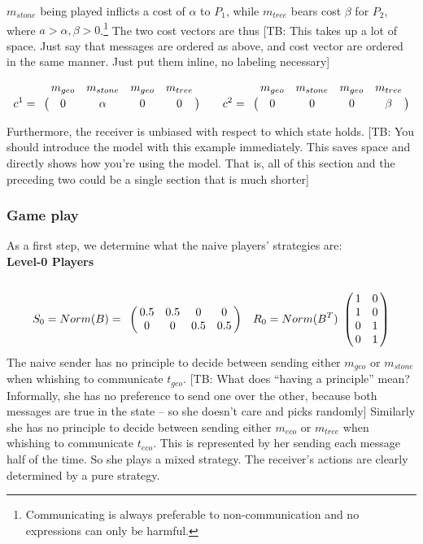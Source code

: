 \documentclass[10pt]{article}
\newcommand{\tb}[1]{\textcolor[rgb]{.8,.33,.0}{[TB: #1]}}%
\begin{document}
$m_{stone}$ being played inflicts a cost of $\alpha$ to $P_1$, while $m_{tree}$ bears cost $\beta$ for $P_2$, where $a>\alpha,\beta>0$.\footnote{Communicating is always preferable to non-communication and no expressions can only be harmful.} The two cost vectors are thus \tb{This takes up a lot of space. Just say that messages are ordered as above, and cost vector are ordered in the same manner. Just put them inline, no labeling necessary}

  \begin{equation*}
  c^1 =
  \bordermatrix{
             & m_{geo} & m_{stone} & m_{geo} & m_{tree}    \cr
             &       0 &         \alpha & 0       & 0
  }\qquad
  c^2 =
    \bordermatrix{
               & m_{geo} & m_{stone} & m_{geo} & m_{tree}    \cr
               &       0 &         0 & 0       & \beta
    }
  \end{equation*}

Furthermore, the receiver is unbiased with respect to which state holds. \tb{You should introduce the model with this example immediately. This saves space and directly shows how you're using the model. That is, all of this section and the preceding two could be a single section that is much shorter}
\subsubsection{Game play}
As a first step, we determine what the naive players' strategies are:\\
\textbf{Level-0 Players}\\
\begin{equation*}
S_0=Norm(B)=
\bordermatrix{
            & & & &    \cr
 &       0.5 &         0.5 & 0       & 0 \cr
 &       0 &         0 & 0.5       & 0.5
 }\quad
R_0=Norm(B^T)
\bordermatrix{
            &  & \cr
    & 1 & 0 \cr
     & 1 & 0 \cr
     & 0 & 1 \cr
     & 0 & 1 \cr
 }
\end{equation*}
The naive sender has no principle to decide between sending either $m_{geo}$ or $m_{stone}$ when whishing to communicate $t_{geo}$. \tb{What does ``having a principle'' mean? Informally, she has no preference to send one over the other, because both messages are true in the state -- so she doesn't care and picks randomly} Similarly she has no principle to decide between sending either $m_{eco}$ or $m_{tree}$ when whishing to communicate $t_{eco}$. This is represented by her sending each message half of the time. So she plays a mixed strategy. The receiver's actions are clearly determined by a pure strategy.\\
\end{document}
